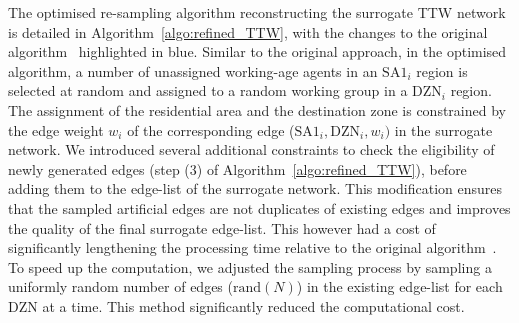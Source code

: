 \documentclass{article}
\begin{document}
\begin{appendices}
The optimised re-sampling algorithm reconstructing the surrogate TTW network is detailed in Algorithm~\ref{algo:refined_TTW}, with the changes to the original algorithm~\cite{fair_creating_2019} highlighted in blue. Similar to the original approach, in the optimised algorithm, a number of unassigned working-age agents in an $\text{SA1}_i$ region is selected at random and assigned to a random working group in a $\text{DZN}_i$ region. The assignment of the residential area and the destination zone is constrained by the edge weight $w_i$ of the corresponding edge ($\text{SA1}_i,\text{DZN}_i, w_i)$ in the surrogate network. We introduced several additional constraints to check the eligibility of newly generated edges  (step (3) of  Algorithm~\ref{algo:refined_TTW}), before adding them to the edge-list of the surrogate network. This modification ensures that the sampled artificial edges are not duplicates of existing edges and improves the quality of the final surrogate edge-list. This however had a cost of significantly lengthening the processing time relative to the original algorithm~\cite{fair_creating_2019}. To speed up the computation, we adjusted the sampling process by sampling a uniformly random number of edges ($\text{rand}(N)$)  in the existing edge-list for each DZN at a time. This method significantly reduced the computational cost.


\end{appendices}
\end{document}
